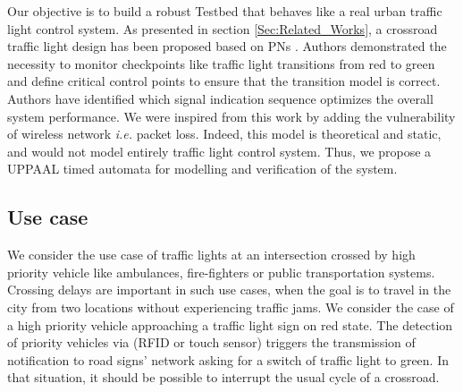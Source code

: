 Our objective is to build a robust Testbed that behaves like a real urban traffic light control system.
As presented in section \ref{Sec:Related_Works}, a crossroad traffic light design has been proposed based on PNs \cite{huang_modular_2014}. Authors demonstrated the necessity to monitor checkpoints like traffic light transitions from red to green and define critical control points to ensure that the transition model is correct. Authors have identified which signal indication sequence optimizes the overall system performance. We were inspired from this work by adding the vulnerability of wireless network \emph{i.e.} packet loss. Indeed, this model is theoretical and static, and would not model entirely traffic light control system. Thus, we propose a UPPAAL timed automata for modelling and verification of the system.



%


\subsection{Use case}

We consider the use case of traffic lights at an intersection crossed by high priority vehicle like ambulances, fire-fighters or public transportation systems. Crossing delays are important in such use cases, when the goal is to travel in the city from two locations without experiencing traffic jams. We consider the case of a high priority vehicle approaching a traffic light sign on red state. The detection of priority vehicles via (RFID or touch sensor) triggers the transmission of notification to road signs' network asking for a switch of traffic light to green. In that situation, it should be possible to interrupt the usual cycle of a crossroad. 

